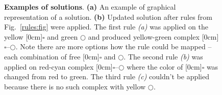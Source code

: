 \documentclass[12pt]{fithesis2}
\begin{document}
\begin{figure}[!h]
\begin{center}
\caption{\textbf{Examples of solutions}. \textbf{(a)} An example of graphical representation of a solution. \textbf{(b)} Updated solution after rules from Fig.~\ref{rules:fig} were applied. The first rule \emph{(a)} was applied on the yellow \raisebox{-0.02cm}[0cm]{{\large $\square$}} and green $\bigcirc$ and produced yellow-green complex \raisebox{-0.02cm}[0cm]{{\large $\square$}}--$\bigcirc$. Note there are more options how the rule could be mapped -- each combination of free \raisebox{-0.02cm}[0cm]{{\large $\square$}} and $\bigcirc$. The second rule \emph{(b)} was applied on red-cyan complex \raisebox{-0.02cm}[0cm]{{\large $\square$}}--$\bigcirc$ where the color of \raisebox{-0.02cm}[0cm]{{\large $\square$}} was changed from red to green. The third rule \emph{(c)} couldn't be applied because there is no such complex with yellow $\bigcirc$. }
\label{solutions:fig}
\end{center}
\end{figure}
\end{document}
